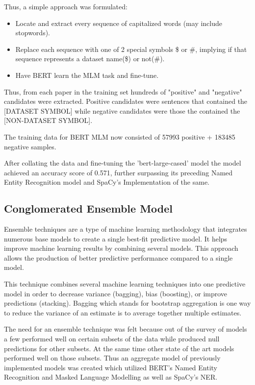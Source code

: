\documentclass[twocolumn]{article}
\begin{document}
Thus, a simple approach was formulated:
\begin{itemize} 
\item Locate and extract every sequence of capitalized words (may include stopwords).
\item Replace each sequence with one of 2 special symbols \$ or \#, implying if that sequence represents a dataset name(\$) or not(\#).
\item Have BERT learn the MLM task and fine-tune. 
\end{itemize}

Thus, from each paper in the training set hundreds of "positive" and "negative" candidates were extracted. Positive candidates were sentences that contained the [DATASET SYMBOL] while negative candidates were those the contained the [NON-DATASET SYMBOL].

The training data for BERT MLM now consisted of 57993 positive + 183485 negative samples.

After collating the data and fine-tuning the 'bert-large-cased' model the model achieved an accuracy score of 0.571, further surpassing its preceding Named Entity Recognition model and SpaCy's Implementation of the same.

\subsection{Conglomerated Ensemble Model}
Ensemble techniques are a type of machine learning methodology that integrates numerous base models to create a single best-fit predictive model. It helps improve machine learning results by combining several models. This approach allows the production of better predictive performance compared to a single model. \par 

This technique combines several machine learning techniques into one predictive model in order to decrease variance (bagging), bias (boosting), or improve predictions (stacking). Bagging which stands for bootstrap aggregation is one way to reduce the variance of an estimate is to average together multiple estimates. \par 

The need for an ensemble technique was felt because out of the survey of models a few performed well on certain subsets of the data while produced null predictions for other subsets. At the same time other state of the art models performed well on those subsets. Thus an aggregate model of previously implemented models was created which utilized BERT's Named Entity Recognition and Masked Language Modelling as well as SpaCy's NER. \par 
\end{document}
